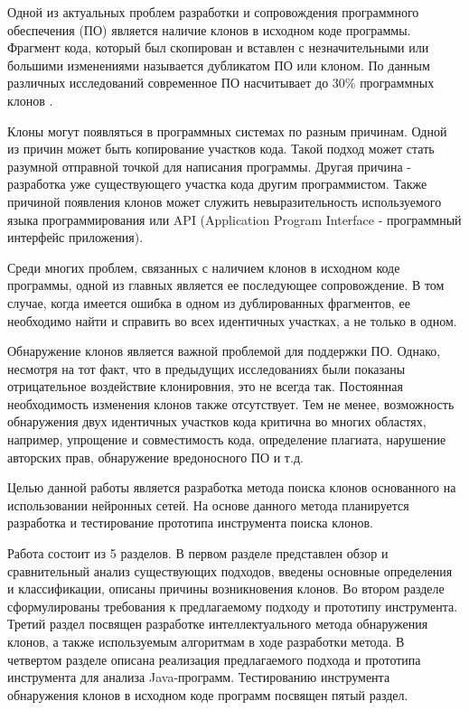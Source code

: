 \intro
Одной из актуальных проблем разработки и сопровождения программного обеспечения (ПО) является наличие клонов в исходном коде программы. Фрагмент кода, который был скопирован и вставлен с незначительными или большими изменениями называется дубликатом ПО или клоном. По данным различных исследований современное ПО насчитывает до 30\% программных клонов \cite{royandcordy}.

Клоны могут появляться в программных системах по разным причинам. Одной из причин может быть копирование участков кода. Такой подход может стать разумной отправной точкой для написания программы. Другая причина - разработка уже существующего участка кода другим программистом. Также причиной появления клонов может служить невыразительность используемого языка программирования или API (Application Program Interface - программный интерфейс приложения).


Среди многих проблем, связанных с наличием клонов в исходном коде программы, одной из главных является ее последующее сопровождение. В том случае, когда имеется ошибка в одном из дублированных фрагментов, ее необходимо найти и справить во всех идентичных участках, а не только в одном.

Обнаружение клонов является важной проблемой для поддержки ПО. Однако, несмотря на тот факт, что в предыдущих исследованиях были показаны отрицательное воздействие клонировния, это не всегда так. Постоянная необходимость изменения клонов также отсутствует. Тем не менее, возможность обнаружения двух идентичных участков кода критична во многих областях, например, упрощение и совместимость кода, определение плагиата, нарушение авторских прав, обнаружение вредоносного ПО и т.д.

Целью данной работы является разработка метода поиска клонов основанного на использовании нейронных сетей. На основе данного метода планируется разработка и тестирование прототипа инструмента поиска клонов.

Работа состоит из 5 разделов. В первом разделе представлен обзор и сравнительный анализ существующих подходов, введены основные определения и классификации, описаны причины возникновения клонов. Во втором разделе сформулированы требования к предлагаемому подходу и прототипу инструмента. Третий раздел посвящен разработке интеллектуального метода обнаружения клонов, а также используемым алгоритмам в ходе разработки метода. В четвертом разделе описана реализация предлагаемого подхода и прототипа инструмента для анализа Java-программ. Тестированию инструмента обнаружения клонов в исходном коде программ посвящен пятый раздел.
